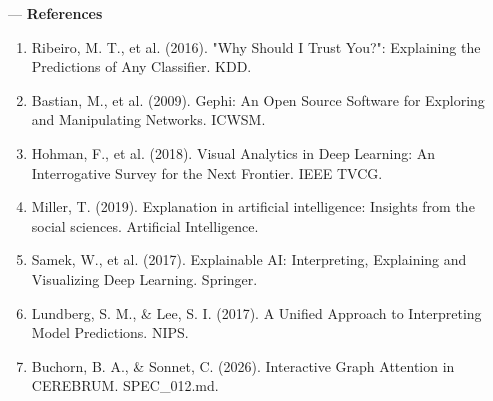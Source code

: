 ---
\textbf{References}
\begin{enumerate}
\item Ribeiro, M. T., et al. (2016). "Why Should I Trust You?": Explaining the Predictions of Any Classifier. KDD.
\item Bastian, M., et al. (2009). Gephi: An Open Source Software for Exploring and Manipu\-lating Networks. ICWSM.
\item Hohman, F., et al. (2018). Visual Analytics in Deep Learning: An Interr\-ogative Survey for the Next Frontier. IEEE TVCG.
\item Miller, T. (2019). Explanation in artificial intel\-ligence: Insights from the social sciences. Artificial Intell\-igence.
\item Samek, W., et al. (2017). Explainable AI: Interp\-reting, Explaining and Visualizing Deep Learning. Springer.
\item Lundberg, S. M., \& Lee, S. I. (2017). A Unified Approach to Interp\-reting Model Predictions. NIPS.
\item Buchorn, B. A., \& Sonnet, C. (2026). Interactive Graph Attention in CEREBRUM. SPEC\_012.md.

\end{enumerate}
